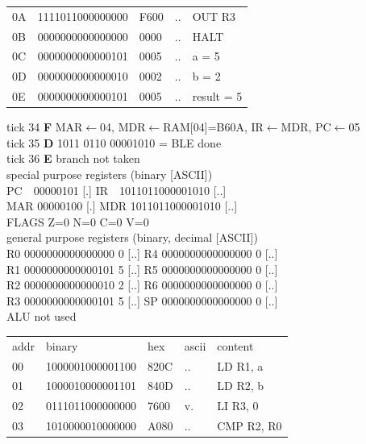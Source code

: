 \begin{tcolorbox}[stepbox, title={Instruction 11 \hfill ticks 31 to 33 \quad CMP R2, R0}]
{\begin{tabular}{@{}lllll@{}}
0A & 1111011000000000 & F600 & .. & OUT R3\\
0B & 0000000000000000 & 0000 & .. & HALT\\
\rowcolor{datac}0C & 0000000000000101 & 0005 & .. & a = 5\\
\rowcolor{datac}0D & 0000000000000010 & 0002 & .. & b = 2\\
\rowcolor{datac}0E & 0000000000000101 & 0005 & .. & result = 5\\
\end{tabular}}
\end{tcolorbox}\hfill\begin{tcolorbox}[stepbox, title={Instruction 12 \hfill ticks 34 to 36 \quad BLE done}]
\textcolor{dim}{tick 34} \textbf{F} MAR$\leftarrow$04, MDR$\leftarrow$RAM[04]=B60A, IR$\leftarrow$MDR, PC$\leftarrow$05\\
\textcolor{dim}{tick 35} \textbf{D} 1011 0110 00001010 = BLE done\\
\textcolor{dim}{tick 36} \textbf{E} branch not taken\\[2pt]
\textcolor{dim}{special purpose registers (binary [ASCII])}\\
PC~~00000101 [.] \hfill IR~~1011011000001010 [..]\\
MAR 00000100 [.] \hfill MDR 1011011000001010 [..]\\
FLAGS Z=0 N=0 C=0 V=0\\[2pt]
\textcolor{dim}{general purpose registers (binary, decimal [ASCII])}\\
R0 0000000000000000 0 [..] \hfill R4 0000000000000000 0 [..]\\
R1 0000000000000101 5 [..] \hfill R5 0000000000000000 0 [..]\\
R2 0000000000000010 2 [..] \hfill R6 0000000000000000 0 [..]\\
R3 0000000000000101 5 [..] \hfill SP 0000000000000000 0 [..]\\
\textcolor{dim}{ALU not used}\\[2pt]
{\setlength{\tabcolsep}{2pt}\begin{tabular}{@{}lllll@{}}
\textcolor{dim}{addr} & \textcolor{dim}{binary} & \textcolor{dim}{hex} & \textcolor{dim}{ascii} & \textcolor{dim}{content}\\
00 & 1000001000001100 & 820C & .. & LD R1, a\\
01 & 1000010000001101 & 840D & .. & LD R2, b\\
02 & 0111011000000000 & 7600 & v. & LI R3, 0\\
03 & 1010000010000000 & A080 & .. & CMP R2, R0\\

\end{tabular}}
\end{tcolorbox}
